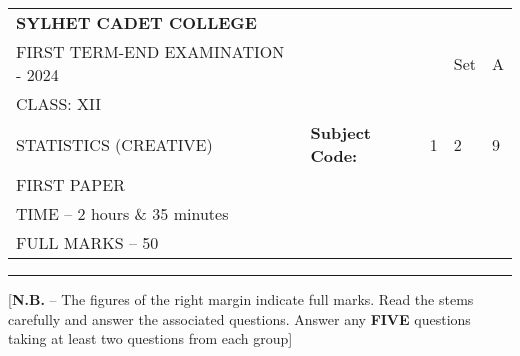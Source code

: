 \documentclass{article}
\begin{document}
\begin{table}[h]
\centering
\begin{tabular}{lllll}
\textbf{\large SYLHET CADET COLLEGE} &  &  &  &  \\ \cline{4-5} 
FIRST TERM-END EXAMINATION - 2024 &  & \multicolumn{1}{l|}{} & 
\multicolumn{1}{l|}{Set} & \multicolumn{1}{l|}{A} \\ \cline{4-5} 
CLASS: XII &  &  &  &  \\ \cline{3-5} 
STATISTICS (CREATIVE)& \multicolumn{1}{l|}{\textbf{Subject Code:}} & 
\multicolumn{1}{l|}{1} & \multicolumn{1}{l|}{2} & \multicolumn{1}{l|}{9} \\ \cline{3-5} 
 FIRST PAPER &  &  &  &  \\
TIME – 2 hours \& 35 minutes &  &  &  &  \\
FULL MARKS – 50 &  &  &  & 
\end{tabular}
\end{table}

\hrule

\begin{center}
[\textbf{N.B.} – The figures of the right margin indicate full marks. Read 
the stems carefully and answer the associated questions. Answer any
\textbf{FIVE} questions taking at least two questions from each group]\\
\end{center}
\end{document}
